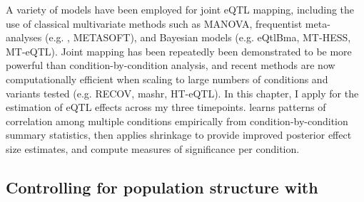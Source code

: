 %
A variety of models have been employed for joint \gls{eQTL} mapping, including
the use of classical multivariate methods such as \gls{MANOVA}\autocite{kim2014CharacterizingGeneticBasis},
frequentist meta-analyses (e.g. \autocite{sul2013EffectivelyIdentifyingEQTLs}, METASOFT), 
and Bayesian models (e.g. eQtlBma\autocite{flutre2013StatisticalFrameworkJoint}, MT-HESS, MT-eQTL).
Joint mapping has been repeatedly been demonstrated to be more powerful than condition-by-condition analysis,
and recent methods are now computationally efficient when scaling to large numbers of conditions and variants tested (e.g. RECOV\autocite{duong2017ApplyingMetaanalysisGenotypetissue}, mashr\autocite{urbut2018FlexibleStatisticalMethods}, HT-eQTL\autocite{li2018HTeQTLIntegrativeExpression}).
In this chapter, I apply \autocite{urbut2018FlexibleStatisticalMethods} for the estimation of \gls{eQTL} effects across my three timepoints.
 learns patterns of correlation among multiple conditions empirically from condition-by-condition summary statistics,
then applies shrinkage to provide improved posterior effect size estimates,
and compute measures of significance per condition. 

\subsection{Controlling for population structure with }

